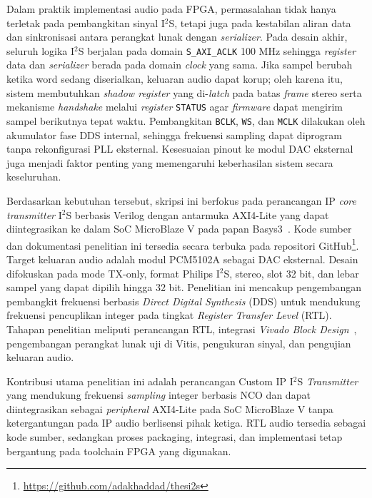 \hspace{1cm}Dalam praktik implementasi audio pada FPGA, permasalahan tidak hanya terletak pada pembangkitan sinyal I$^2$S, tetapi juga pada kestabilan aliran data dan sinkronisasi antara perangkat lunak dengan \textit{serializer}. Pada desain akhir, seluruh logika I$^2$S berjalan pada domain \texttt{S\_AXI\_ACLK} 100 MHz sehingga \textit{register} data dan \textit{serializer} berada pada domain \textit{clock} yang sama. Jika sampel berubah ketika word sedang diserialkan, keluaran audio dapat korup; oleh karena itu, sistem membutuhkan \textit{shadow register} yang di-\textit{latch} pada batas \textit{frame} stereo serta mekanisme \textit{handshake} melalui \textit{register} \texttt{STATUS} agar \textit{firmware} dapat mengirim sampel berikutnya tepat waktu. Pembangkitan \texttt{BCLK}, \texttt{WS}, dan \texttt{MCLK} dilakukan oleh akumulator fase DDS internal, sehingga frekuensi sampling dapat diprogram tanpa rekonfigurasi PLL eksternal. Kesesuaian pinout ke modul DAC eksternal~\citep{pcm5102a_datasheet} juga menjadi faktor penting yang memengaruhi keberhasilan sistem secara keseluruhan.

\hspace{1cm}Berdasarkan kebutuhan tersebut, skripsi ini berfokus pada perancangan IP \textit{core} \textit{transmitter} I$^2$S berbasis Verilog dengan antarmuka AXI4-Lite yang dapat diintegrasikan ke dalam SoC MicroBlaze V pada papan Basys3~\citep{xilinx_basys3_ref}. Kode sumber dan dokumentasi penelitian ini tersedia secara terbuka pada repositori GitHub\footnote{\url{https://github.com/adakhaddad/thesi2s}}. Target keluaran audio adalah modul PCM5102A sebagai DAC eksternal. Desain difokuskan pada mode TX-only, format Philips I$^2$S, stereo, slot 32 bit, dan lebar sampel yang dapat dipilih hingga 32 bit. Penelitian ini mencakup pengembangan pembangkit frekuensi berbasis \textit{Direct Digital Synthesis} (DDS) untuk mendukung frekuensi pencuplikan integer pada tingkat \textit{Register Transfer Level} (RTL). Tahapan penelitian meliputi perancangan RTL, integrasi \textit{Vivado Block Design}~\citep{xilinx_vivado_ip_subsystems_2025}, pengembangan perangkat lunak uji di Vitis, pengukuran sinyal, dan pengujian keluaran audio.

\hspace{1cm}Kontribusi utama penelitian ini adalah perancangan Custom IP I$^2$S \textit{Transmitter} yang mendukung frekuensi \textit{sampling} integer berbasis NCO dan dapat diintegrasikan sebagai \textit{peripheral} AXI4-Lite pada SoC MicroBlaze V tanpa ketergantungan pada IP audio berlisensi pihak ketiga. RTL audio tersedia sebagai kode sumber, sedangkan proses packaging, integrasi, dan implementasi tetap bergantung pada toolchain FPGA yang digunakan.

